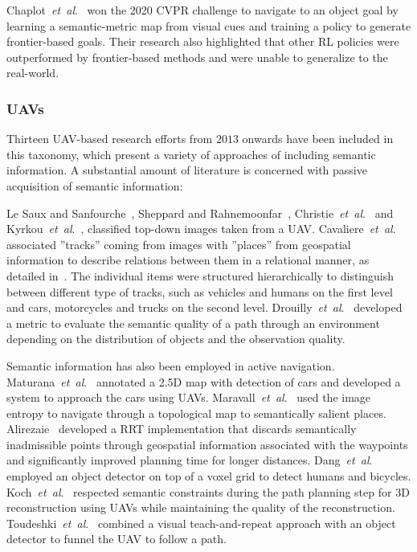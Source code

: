 \documentclass[twocolumn,letterpaper]{IEEEAerospaceCLS}  %
\newcommand{\abbreviation}[1]{\emph{#1}.}
\newcommand{\etal}{\abbreviation{et~al}}
\begin{document}
Chaplot~\etal~\cite{chaplot_object_2020} won the 2020 CVPR challenge to navigate to an object goal by learning a semantic-metric map from visual cues and training a policy to generate frontier-based goals. Their research also highlighted that other RL policies were outperformed by frontier-based methods and were unable to generalize to the real-world.

\subsubsection{UAVs} \label{sssec:LitResUAV}
Thirteen UAV-based research efforts from $2013$ onwards have been included in this taxonomy, which present a variety of approaches of including semantic information. A substantial amount of literature is concerned with passive acquisition of semantic information:

Le Saux and Sanfourche~\cite{saux_rapid_2013}, Sheppard and Rahnemoonfar~\cite{sheppard_real-time_2017}, Christie~\etal~\cite{christie_semantics_2016} and Kyrkou~\etal~\cite{kyrkou_dronet:_2018}, classified top-down images taken from a UAV. Cavaliere~\etal~\cite{cavaliere_towards_2016,cavaliere_towards_2018} associated ''tracks'' coming from images with ''places'' from geospatial information to describe relations between them in a relational manner, as detailed in~\cite{landsiedel_review_2017}. The individual items were structured hierarchically to distinguish between different type of tracks, such as vehicles and humans on the first level and cars, motorcycles and trucks on the second level. Drouilly~\etal~\cite{drouilly_semantic_2015} developed a metric to evaluate the semantic quality of a path through an environment depending on the distribution of objects and the observation quality.

Semantic information has also been employed in active navigation. Maturana~\etal~\cite{maturana_looking_2017} annotated a 2.5D map with detection of cars and developed a system to approach the cars using UAVs. Maravall~\etal~\cite{maravall_navigation_2017} used the image entropy to navigate through a topological map to semantically salient places. Alirezaie~\cite{alirezaie_exploiting_2017} developed a RRT implementation that discards semantically inadmissible points through geospatial information associated with the waypoints and significantly improved planning time for longer distances. Dang~\etal~\cite{dang_autonomous_2018} employed an object detector on top of a voxel grid to detect humans and bicycles. Koch~\etal~\cite{koch_automatic_2019} respected semantic constraints during the path planning step for 3D reconstruction using UAVs while maintaining the quality of the reconstruction.
Toudeshki~\etal~\cite{toudeshki_robust_2018} combined a visual teach-and-repeat approach with an object detector to funnel the UAV to follow a path.
\end{document}
